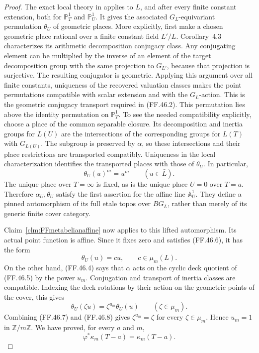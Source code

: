\begin{proof}
The exact local theory in
\citet[Theorem~4.1 and Corollaries~4.3--4.5]
{FF_Koenigsmann2003} applies to \(L\), and after every
finite constant extension, both for \(\mathbb P^1_T\)
and \(\mathbb P^1_U\). It gives the associated
\(G_L\)-equivariant permutation \(\theta_U\) of
geometric places. More explicitly, first make a chosen
geometric place rational over a finite constant field
\(L'/L\). Corollary~4.3 characterizes its arithmetic
decomposition conjugacy class. Any conjugating element
can be multiplied by the inverse of an element of the
target decomposition group with the same projection to
\(G_{L'}\), because that projection is surjective.
The resulting conjugator is geometric. Applying this
argument over all finite constants, uniqueness of the
recovered valuation classes makes the point permutations
compatible with scalar extension and with the
\(G_L\)-action. This is the geometric conjugacy
transport required in (FF.46.2).
This permutation lies above the
identity permutation on \(\mathbb P^1_T\). To see
the needed compatibility explicitly, choose a place of
the common separable closure. Its decomposition and
inertia groups for \(L(U)\) are the intersections of
the corresponding groups for \(L(T)\) with
\(G_{L(U)}\). The subgroup is preserved by
\(\alpha\), so these intersections and their place
restrictions are transported compatibly. Uniqueness in
the local characterization identifies the transported
places with those of \(\theta_U\). In particular,
\[
                           \theta_U(u)^m=u^m
                  \qquad(u\in\bar L).
                                                        \tag{FF.46.6}
\]
The unique place over \(T=\infty\) is fixed, as is
the unique place \(U=0\) over \(T=a\). Therefore
\(\alpha_U,\theta_U\) satisfy the first assertion
for the affine line \(\mathbb A^1_U\). They define
a pinned automorphism of its full etale topos over
\(BG_L\), rather than merely of its generic finite
cover category.

Claim~\ref{clm:FFmetabelianaffine} now applies to this
lifted automorphism. Its actual point function is affine.
Since it fixes zero and satisfies (FF.46.6), it has the
form
\[
                       \theta_U(u)=c u,
                       \qquad c\in\mu_m(L).
                                                        \tag{FF.46.7}
\]
On the other hand, (FF.46.4) says that \(\alpha\)
acts on the cyclic deck quotient of (FF.46.5) by the
power \(u_m\). Conjugation and transport of inertia
classes are compatible. Indexing the deck rotations by
their action on the geometric points of the cover,
this gives
\[
                    \theta_U(\zeta u)
                          =\zeta^{u_m}\theta_U(u)
                    \qquad(\zeta\in\mu_m).
                                                        \tag{FF.46.8}
\]
Combining
(FF.46.7) and (FF.46.8) gives
\(\zeta^{u_m}=\zeta\) for every \(\zeta\in\mu_m\).
Hence \(u_m=1\) in \(\mathbb Z/m\mathbb Z\).
We have proved, for every \(a\) and \(m\),
\[
                  \varphi^*\kappa_m(T-a)=\kappa_m(T-a).
                                                        \tag{FF.46.9}
\]


\end{proof}
